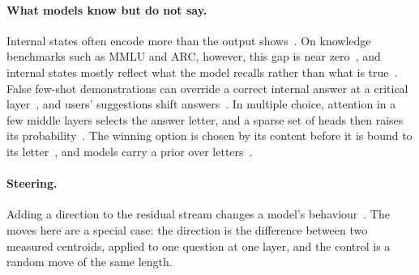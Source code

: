 \paragraph{What models know but do not say.}
Internal states often encode more than the output shows~\citep{orgad2024llms,gekhman2025insideout,ruscio2026on}. On knowledge benchmarks such as MMLU and ARC, however, this gap is near zero~\citep{park2025bridging}, and internal states mostly reflect what the model recalls rather than what is true~\citep{cheang2026do}. False few-shot demonstrations can override a correct internal answer at a critical layer~\citep{halawi2023overthinking}, and users' suggestions shift answers~\citep{sharma2023towards}. In multiple choice, attention in a few middle layers selects the answer letter, and a sparse set of heads then raises its probability~\citep{wiegreffe2024answer}. The winning option is chosen by its content before it is bound to its letter~\citep{wong2026when}, and models carry a prior over letters~\citep{zheng2023large}.

\paragraph{Steering.}
Adding a direction to the residual stream changes a model's behaviour~\citep{panickssery2023steering,li2023inferencetime}. The moves here are a special case: the direction is the difference between two measured centroids, applied to one question at one layer, and the control is a random move of the same length.
